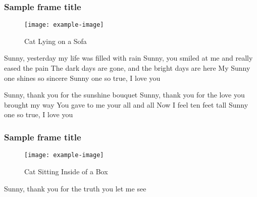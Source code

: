 \documentclass[t]{beamer}
\begin{document}
\begin{frame}
\frametitle{Sample frame title}

\begin{figure}
    \centering
    \texttt{[image: example-image]}
    \caption{Cat Lying on a Sofa}
    \label{fig:my_label}
\end{figure}

Sunny, yesterday my life was filled with rain
Sunny, you smiled at me and really eased the pain
The dark days are gone, and the bright days are here
My Sunny one shines so sincere
Sunny one so true, I love you

Sunny, thank you for the sunshine bouquet
Sunny, thank you for the love you brought my way
You gave to me your all and all
Now I feel ten feet tall
Sunny one so true, I love you

\end{frame}

\begin{frame}
\frametitle{Sample frame title} 
\begin{figure}
    \centering
    \texttt{[image: example-image]}
    \caption{Cat Sitting Inside of a Box}
    \label{fig:my_label_a}
\end{figure}

Sunny, thank you for the truth you let me see

\end{frame}
\end{document}
